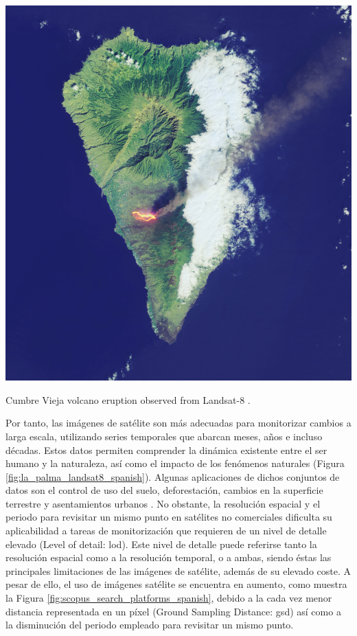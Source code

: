\begin{marginfigure}[0cm]
	\includegraphics{figs/introduction/landsat8_lapalma.jpg}
	\caption{Cumbre Vieja volcano eruption observed from Landsat-8 \cite{nasa_earth_observatory_lava_2021}.}
	\label{fig:la_palma_landsat8_spanish}
\end{marginfigure}
Por tanto, las imágenes de satélite son más adecuadas para monitorizar cambios a larga escala, utilizando series temporales que abarcan meses, años e incluso décadas. Estos datos permiten comprender la dinámica existente entre el ser humano y la naturaleza, así como el impacto de los fenómenos naturales (Figura \ref{fig:la_palma_landsat8_spanish}). Algunas aplicaciones de dichos conjuntos de datos son el control de uso del suelo, deforestación, cambios en la superficie terrestre y asentamientos urbanos \cite{asokan_change_2019}. No obstante, la resolución espacial y el periodo para revisitar un mismo punto en satélites no comerciales dificulta su aplicabilidad a tareas de monitorización que requieren de un nivel de detalle elevado (Level of detail: \acrshort{lod}). Este nivel de detalle puede referirse tanto la resolución espacial como a la resolución temporal, o a ambas, siendo éstas las principales limitaciones de las imágenes de satélite, además de su elevado coste. A pesar de ello, el uso de imágenes satélite se encuentra en aumento, como muestra la Figura \ref{fig:scopus_search_platforms_spanish}, debido a la cada vez menor distancia representada en un píxel (Ground Sampling Distance: \acrshort{gsd}) así como a la disminución del periodo empleado para revisitar un mismo punto. 

